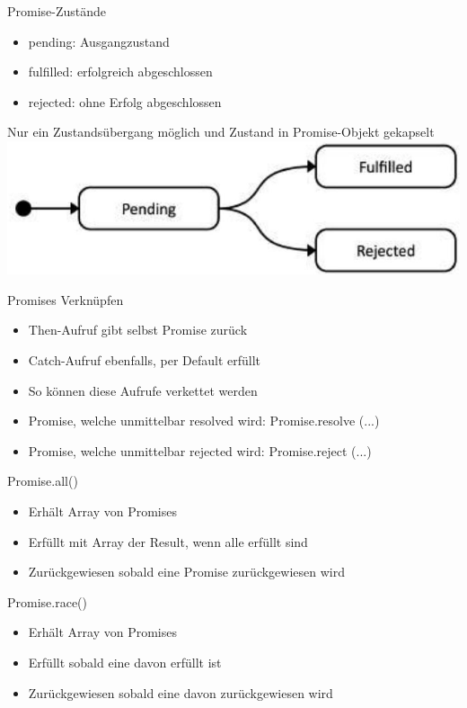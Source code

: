 \begin{theorem}{Promise-Zustände}
\begin{itemize}
  \item pending: Ausgangzustand
  \item fulfilled: erfolgreich abgeschlossen
  \item rejected: ohne Erfolg abgeschlossen
  \end{itemize}
  Nur ein Zustandsübergang möglich und Zustand in Promise-Objekt gekapselt\\
\includegraphics[width=0.8\linewidth]{images/2024_12_29_858f09cde51177c71657g-14}
\end{theorem}

\begin{corollary}{Promises Verknüpfen}
\begin{itemize}
  \item Then-Aufruf gibt selbst Promise zurück
  \item Catch-Aufruf ebenfalls, per Default erfüllt
  \item So können diese Aufrufe verkettet werden
  \item Promise, welche unmittelbar resolved wird: Promise.resolve (...)
  \item Promise, welche unmittelbar rejected wird: Promise.reject (...)
\end{itemize}
\end{corollary}

\begin{definition}{Promise.all()}
\begin{itemize}
  \item Erhält Array von Promises
  \item Erfüllt mit Array der Result, wenn alle erfüllt sind
  \item Zurückgewiesen sobald eine Promise zurückgewiesen wird
\end{itemize}
\end{definition}

\begin{definition}{Promise.race()}
\begin{itemize}
  \item Erhält Array von Promises
  \item Erfüllt sobald eine davon erfüllt ist
  \item Zurückgewiesen sobald eine davon zurückgewiesen wird
\end{itemize}
\end{definition}

